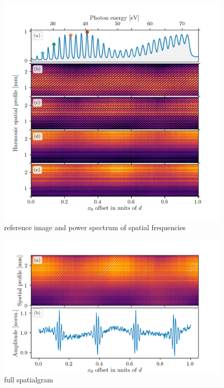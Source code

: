 \begin{figure}
	\centering
	\includegraphics[width=1.0\textwidth]{figures/Two_source/harmonic_spatialgrams.png}
	\caption{reference image and power spectrum of spatial frequencies}
	\label{fig:harmonic_spatialgrams}
\end{figure}



\begin{figure}
	\centering
	\includegraphics[width=1.0\textwidth]{figures/Two_source/full_spatialgram.png}
	\caption{full spatialgram}
	\label{fig:full_spatialgram}
\end{figure}


